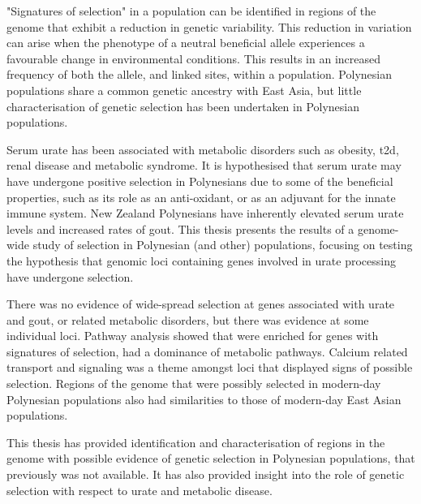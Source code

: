 "Signatures of selection" in a population can be identified in regions of the genome that exhibit a reduction in genetic variability. This reduction in variation can arise when the phenotype of a neutral beneficial allele experiences a favourable change in environmental conditions. This results in an increased frequency of both the allele, and linked sites, within a population. Polynesian populations share a common genetic ancestry with East Asia, but little characterisation of genetic selection has been undertaken in Polynesian populations.

Serum urate has been associated with metabolic disorders such as obesity, \gls{t2d}, renal disease and metabolic syndrome. It is hypothesised that serum urate may have undergone positive selection in Polynesians due to some of the beneficial properties, such as its role as an anti-oxidant, or as an adjuvant for the innate immune system. New Zealand Polynesians have inherently elevated serum urate levels and increased rates of gout. This thesis presents the results of a genome-wide study of selection in Polynesian (and other) populations, focusing on testing the hypothesis that genomic loci containing genes involved in urate processing have undergone selection.

There was no evidence of wide-spread selection at genes associated with urate and gout, or related metabolic disorders, but there was evidence at some individual loci. Pathway analysis showed that were enriched for genes with signatures of selection, had a dominance of metabolic pathways. Calcium related transport and signaling was a theme amongst loci that displayed signs of possible selection. Regions of the genome that were possibly selected in modern-day Polynesian populations also had similarities to those of modern-day East Asian populations.

This thesis has provided identification and characterisation of regions in the genome with possible evidence of genetic selection in Polynesian populations, that previously was not available. It has also provided insight into the role of genetic selection with respect to urate and metabolic disease.
